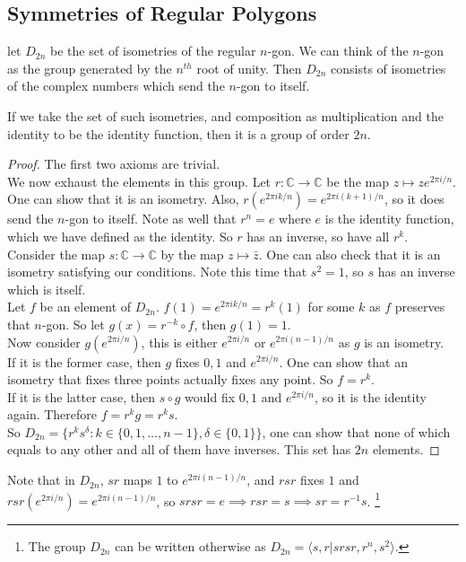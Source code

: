 \subsection{Symmetries of Regular Polygons}
let $D_{2n}$ be the set of isometries of the regular $n$-gon.
We can think of the $n$-gon as the group generated by the $n^{th}$ root of unity.
Then $D_{2n}$ consists of isometries of the complex numbers which send the $n$-gon to itself.
\begin{theorem}
    If we take the set of such isometries, and composition as multiplication and the identity to be the identity function, then it is a group of order $2n$.
\end{theorem}
\begin{proof}
    The first two axioms are trivial.\\
    We now exhaust the elements in this group.
    Let $r:\mathbb C\to\mathbb C$ be the map $z\mapsto ze^{2\pi i/n}$.
    One can show that it is an isometry.
    Also, $r(e^{2\pi ik/n})=e^{2\pi i(k+1)/n}$, so it does send the $n$-gon to itself.
    Note as well that $r^n=e$ where $e$ is the identity function, which we have defined as the identity.
    So $r$ has an inverse, so have all $r^k$.\\
    Consider the map $s:\mathbb C\to\mathbb C$ by the map $z\mapsto\bar z$.
    One can also check that it is an isometry satisfying our conditions.
    Note this time that $s^2=1$, so $s$ has an inverse which is itself.\\
    Let $f$ be an element of $D_{2n}$.
    $f(1)=e^{2\pi ik/n}=r^k(1)$ for some $k$ as $f$ preserves that $n$-gon.
    So let $g(x)=r^{-k}\circ f$, then $g(1)=1$.\\
    Now consider $g(e^{2\pi i/n})$, this is either $e^{2\pi i/n}$ or $e^{2\pi i(n-1)/n}$ as $g$ is an isometry.\\
    If it is the former case, then $g$ fixes $0,1$ and $e^{2\pi i/n}$.
    One can show that an isometry that fixes three points actually fixes any point.
    So $f=r^{k}$.\\
    If it is the latter case, then $s\circ g$ would fix $0,1$ and $e^{2\pi i/n}$, so it is the identity again.
    Therefore $f=r^{k}g=r^{k}s$.\\
    So $D_{2n}=\{r^ks^\delta:k\in\{0,1,\ldots,n-1\}, \delta\in\{0,1\}\}$, one can show that none of which equals to any other and all of them have inverses.
    This set has $2n$ elements.
\end{proof}
Note that in $D_{2n}$, $sr$ maps $1$ to $e^{2\pi i(n-1)/n}$, and $rsr$ fixes $1$ and $rsr(e^{2\pi i/n})=e^{2\pi i(n-1)/n}$, so $srsr=e\implies rsr=s\implies sr=r^{-1}s$.
\footnote{The group $D_{2n}$ can be written otherwise as $D_{2n}=\langle s,r|srsr, r^n, s^2\rangle$.}
